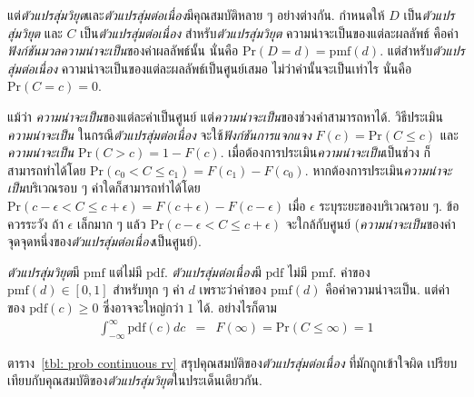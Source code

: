 แต่\textit{ตัวแปรสุ่มวิยุต}และ\textit{ตัวแปรสุ่มต่อเนื่อง}มีคุณสมบัติหลาย ๆ อย่างต่างกัน.
กำหนดให้
$D$ เป็น\textit{ตัวแปรสุ่มวิยุต}
และ
$C$ เป็น\textit{ตัวแปรสุ่มต่อเนื่อง}
สำหรับ\textit{ตัวแปรสุ่มวิยุต}
ความน่าจะเป็นของแต่ละผลลัพธ์
คือค่า\textit{ฟังก์ชันมวลความน่าจะเป็น}ของค่าผลลัพธ์นั้น
นั่นคือ $\mathrm{Pr}(D = d) = \mathrm{pmf}(d)$.
แต่สำหรับ\textit{ตัวแปรสุ่มต่อเนื่อง}
ความน่าจะเป็นของแต่ละผลลัพธ์เป็นศูนย์เสมอ
ไม่ว่าค่านั้นจะเป็นเท่าไร
นั่นคือ $\mathrm{Pr}(C = c) = 0$.

แม้ว่า
\textit{ความน่าจะเป็น}ของแต่ละค่าเป็นศูนย์
แต่\textit{ความน่าจะเป็น}ของช่วงค่าสามารถหาได้.
วิธีประเมิน\textit{ความน่าจะเป็น} ในกรณี\textit{ตัวแปรสุ่มต่อเนื่อง}
จะใช้\textit{ฟังก์ชันการแจกแจง} $F(c) = \mathrm{Pr}(C \leq c)$
และ\textit{ความน่าจะเป็น} $\mathrm{Pr}(C > c) = 1 - F(c)$.
เมื่อต้องการประเมิน\textit{ความน่าจะเป็น}เป็นช่วง ก็สามารถทำได้โดย
$\mathrm{Pr}(c_0 < C \leq c_1) = F(c_1) - F(c_0)$.
หากต้องการประเมิน\textit{ความน่าจะเป็น}บริเวณรอบ ๆ ค่าใดก็สามารถทำได้โดย
$\mathrm{Pr}(c - \epsilon < C \leq c + \epsilon) = F(c + \epsilon) - F(c - \epsilon)$ เมื่อ $\epsilon$ ระบุระยะของบริเวณรอบ ๆ.
ข้อควรระวัง ถ้า $\epsilon$ เล็กมาก ๆ แล้ว $\mathrm{Pr}(c - \epsilon < C \leq c + \epsilon)$ จะใกล้กับศูนย์
(\textit{ความน่าจะเป็น}ของค่าจุดจุดหนึ่งของ\textit{ตัวแปรสุ่มต่อเนื่อง}เป็นศูนย์).

\textit{ตัวแปรสุ่มวิยุต}มี $\mathrm{pmf}$ แต่ไม่มี $\mathrm{pdf}$.
\textit{ตัวแปรสุ่มต่อเนื่อง}มี $\mathrm{pdf}$ ไม่มี $\mathrm{pmf}$.
ค่าของ $\mathrm{pmf}(d) \in [0,1]$ สำหรับทุก ๆ ค่า $d$
เพราะว่าค่าของ $\mathrm{pmf}(d)$ คือค่าความน่าจะเป็น.
แต่ค่าของ $\mathrm{pdf}(c) \geq 0$ ซึ่งอาจจะใหญ่กว่า $1$ ได้.
อย่างไรก็ตาม 
\begin{eqnarray}
\int_{-\infty}^{\infty} \mathrm{pdf}(c) dc &=& F(\infty)
	= \mathrm{Pr}(C \leq \infty) = 1
\nonumber
\end{eqnarray}

ตาราง~\ref{tbl: prob continuous rv}
สรุปคุณสมบัติของ\textit{ตัวแปรสุ่มต่อเนื่อง}
ที่มักถูกเข้าใจผิด
เปรียบเทียบกับคุณสมบัติของ\textit{ตัวแปรสุ่มวิยุต}ในประเด็นเดียวกัน.

